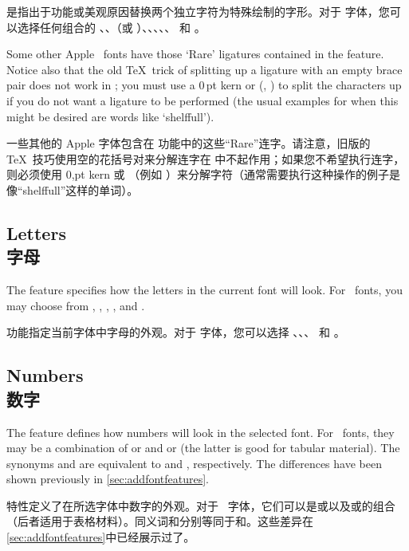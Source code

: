 \documentclass[a4paper]{l3doc}
\begin{document}
是指出于功能或美观原因替换两个独立字符为特殊绘制的字形。对于 \AAT 字体，您可以选择任何组合的 、、（或 ）、、、、、 和 。

Some other Apple \AAT\ fonts have those `Rare' ligatures contained in
the  feature. Notice also that the old \TeX\ trick of
splitting up a ligature with an empty brace pair does not work in
\XeTeX; you must use a 0\,pt kern or  (\eg, ) to
split the characters up if you do not want a ligature to be performed (the usual examples for when this might be desired are words like `shelf\null full').

一些其他的 Apple \AAT 字体包含在  功能中的这些“Rare”连字。请注意，旧版的 \TeX\ 技巧使用空的花括号对来分解连字在 \XeTeX 中不起作用；如果您不希望执行连字，则必须使用 0,pt kern 或 （例如 ）来分解字符（通常需要执行这种操作的例子是像“shelf\null full”这样的单词）。

\subsection{Letters\\字母} \label{sec:aat-letters}
The  feature specifies how the letters in the current font
will look. For \AAT\ fonts, you may choose from ,
, , , and
.

 功能指定当前字体中字母的外观。对于 \AAT 字体，您可以选择 、、、 和 。

\subsection{Numbers\\数字}
The  feature defines how numbers will look in the
selected font. For \AAT\ fonts, they may be a
combination of  or  and  or
 (the latter is good for tabular material). The synonyms
 and  are equivalent to  and
, respectively. The differences have been shown previously
in \vref{sec:addfontfeatures}.

特性定义了在所选字体中数字的外观。对于 \AAT\ 字体，它们可以是或以及或的组合（后者适用于表格材料）。同义词和分别等同于和。这些差异在\vref{sec:addfontfeatures}中已经展示过了。
\end{document}

